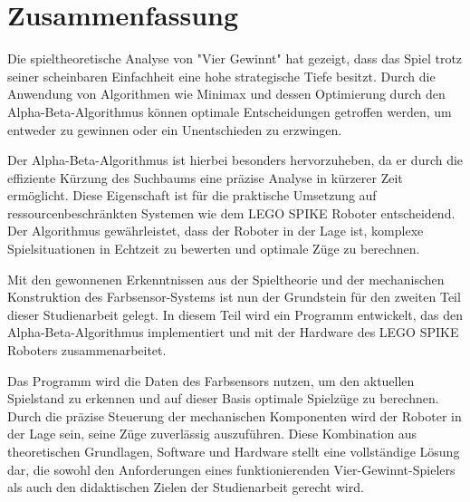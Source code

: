 \chapter{Zusammenfassung}


Die spieltheoretische Analyse von "Vier Gewinnt" hat gezeigt, dass das Spiel trotz seiner scheinbaren Einfachheit eine hohe strategische Tiefe besitzt. Durch die Anwendung von Algorithmen wie Minimax und dessen Optimierung durch den Alpha-Beta-Algorithmus können optimale Entscheidungen getroffen werden, um entweder zu gewinnen oder ein Unentschieden zu erzwingen. 

Der Alpha-Beta-Algorithmus ist hierbei besonders hervorzuheben, da er durch die effiziente Kürzung des Suchbaums eine präzise Analyse in kürzerer Zeit ermöglicht. Diese Eigenschaft ist für die praktische Umsetzung auf ressourcenbeschränkten Systemen wie dem LEGO SPIKE Roboter entscheidend. Der Algorithmus gewährleistet, dass der Roboter in der Lage ist, komplexe Spielsituationen in Echtzeit zu bewerten und optimale Züge zu berechnen.

Mit den gewonnenen Erkenntnissen aus der Spieltheorie und der mechanischen Konstruktion des Farbsensor-Systems ist nun der Grundstein für den zweiten Teil dieser Studienarbeit gelegt. In diesem Teil wird ein Programm entwickelt, das den Alpha-Beta-Algorithmus implementiert und mit der Hardware des LEGO SPIKE Roboters zusammenarbeitet. 

Das Programm wird die Daten des Farbsensors nutzen, um den aktuellen Spielstand zu erkennen und auf dieser Basis optimale Spielzüge zu berechnen. Durch die präzise Steuerung der mechanischen Komponenten wird der Roboter in der Lage sein, seine Züge zuverlässig auszuführen. Diese Kombination aus theoretischen Grundlagen, Software und Hardware stellt eine vollständige Lösung dar, die sowohl den Anforderungen eines funktionierenden Vier-Gewinnt-Spielers als auch den didaktischen Zielen der Studienarbeit gerecht wird.
